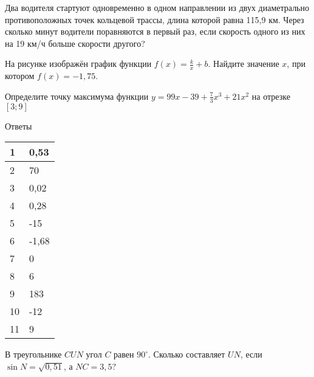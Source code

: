 \documentclass[twocolumn]{article}
\begin{document}
\begin{taskBN}{9}
Два водителя стартуют одновременно в одном направлении из двух диаметрально противоположных точек кольцевой трассы, длина которой равна 115,9 км. Через сколько минут водители поравняются в первый раз, если скорость одного из них на 19 км/ч больше скорости другого? 
\end{taskBN}

\begin{taskBN}{10}
На рисунке изображён график функции $f(x)=\frac{k}{x}+b$. Найдите значение $x$, при котором $f(x)=-1,75$.\vspace{2.5cm}
\end{taskBN}

\begin{taskBN}{11}
Определите точку максимума функции $y = 99x-39+\frac{7}{3}x^{3}+21x^{2}$ на отрезке $\left[3;9 \right]$
\end{taskBN}

\newpage
 Ответы

\begin{table}[h]\begin{tabular}{|l|l|}
\hline
1 & 0,53
\\
\hline
2 & 70
\\
\hline
3 & 0,02
\\
\hline
4 & 0,28
\\
\hline
5 & -15
\\
\hline
6 & -1,68
\\
\hline
7 & 0
\\
\hline
8 & 6
\\
\hline
9 & 183
\\
\hline
10 & -12
\\
\hline
11 & 9
\\
\hline
\end{tabular}\end{table}



\newpage




\cleardoublepage
\def\examvart{Вариант 18.2}
\normalsize

\startpartone
\large




\begin{taskBN}{1}
В треугольнике $CUN$ угол $C$ равен $90^\circ$. Сколько составляет  $UN$, если $\sin{N}=\sqrt{0,51}$, а  $NC=3,5$? 
\end{taskBN}
\end{document}
